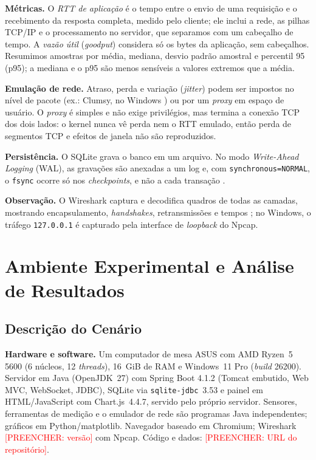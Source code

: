 \documentclass[conference]{IEEEtran}
\newcommand{\pend}[1]{\textcolor{red}{[PREENCHER: #1]}}
\begin{document}
\textbf{Métricas.} O \emph{RTT de aplicação} é o tempo entre o envio de uma requisição e o recebimento da resposta completa, medido pelo cliente; ele inclui a rede, as pilhas TCP/IP e o processamento no servidor, que separamos com um cabeçalho de tempo. A \emph{vazão útil} (\emph{goodput}) considera só os bytes da aplicação, sem cabeçalhos. Resumimos amostras por média, mediana, desvio padrão amostral e percentil 95 (p95); a mediana e o p95 são menos sensíveis a valores extremos que a média.

\textbf{Emulação de rede.} Atraso, perda e variação (\emph{jitter}) podem ser impostos no nível de pacote (ex.: Clumsy, no Windows \cite{clumsy}) ou por um \emph{proxy} em espaço de usuário. O \emph{proxy} é simples e não exige privilégios, mas termina a conexão TCP dos dois lados: o kernel nunca vê perda nem o RTT emulado, então perda de segmentos TCP e efeitos de janela não são reproduzidos.

\textbf{Persistência.} O SQLite grava o banco em um arquivo. No modo \emph{Write-Ahead Logging} (WAL), as gravações são anexadas a um log e, com \texttt{synchronous=NORMAL}, o \texttt{fsync} ocorre só nos \emph{checkpoints}, e não a cada transação \cite{sqlite}.

\textbf{Observação.} O Wireshark captura e decodifica quadros de todas as camadas, mostrando encapsulamento, \emph{handshakes}, retransmissões e tempos \cite{wireshark}; no Windows, o tráfego \texttt{127.0.0.1} é capturado pela interface de \emph{loopback} do Npcap.

\section{Ambiente Experimental e Análise de Resultados}
\subsection{Descrição do Cenário}
\textbf{Hardware e software.} Um computador de mesa ASUS com AMD Ryzen~5 5600 (6 núcleos, 12 \emph{threads}), 16~GiB de RAM e Windows~11 Pro (\emph{build} 26200). Servidor em Java (OpenJDK~27) com Spring Boot 4.1.2 \cite{spring} (Tomcat embutido, Web MVC, WebSocket, JDBC), SQLite \cite{sqlite} via \texttt{sqlite-jdbc}~3.53 e painel em HTML/JavaScript com Chart.js~4.4.7, servido pelo próprio servidor. Sensores, ferramentas de medição e o emulador de rede são programas Java independentes; gráficos em Python/matplotlib. Navegador baseado em Chromium; Wireshark \pend{versão} com Npcap. Código e dados: \pend{URL do repositório}.
\end{document}
